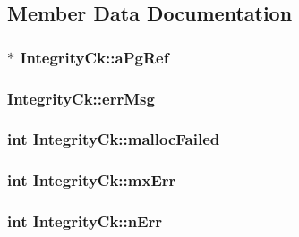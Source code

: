 \subsection{Member Data Documentation}
\hypertarget{struct_integrity_ck_a317f80aef5842ad69df75b55e14118d1}{
\subsubsection[{a\-Pg\-Ref}]{$\ast$ Integrity\-Ck\-::a\-Pg\-Ref}}\label{struct_integrity_ck_a317f80aef5842ad69df75b55e14118d1}
\hypertarget{struct_integrity_ck_a1e9b79bb1d7b22a840001333200a950e}{
\subsubsection[{err\-Msg}]{ Integrity\-Ck\-::err\-Msg}}\label{struct_integrity_ck_a1e9b79bb1d7b22a840001333200a950e}
\hypertarget{struct_integrity_ck_a8e448c1d6483a0326a7ec39291782030}{
\subsubsection[{malloc\-Failed}]{\setlength{\rightskip}{0pt plus 5cm}int Integrity\-Ck\-::malloc\-Failed}}\label{struct_integrity_ck_a8e448c1d6483a0326a7ec39291782030}
\hypertarget{struct_integrity_ck_a9daa97cdcb1366c503451ab2af9e7ba6}{
\subsubsection[{mx\-Err}]{\setlength{\rightskip}{0pt plus 5cm}int Integrity\-Ck\-::mx\-Err}}\label{struct_integrity_ck_a9daa97cdcb1366c503451ab2af9e7ba6}
\hypertarget{struct_integrity_ck_a52c815a1d19be87d0ab4dc0a4e4d38e2}{
\subsubsection[{n\-Err}]{\setlength{\rightskip}{0pt plus 5cm}int Integrity\-Ck\-::n\-Err}}\label{struct_integrity_ck_a52c815a1d19be87d0ab4dc0a4e4d38e2}
